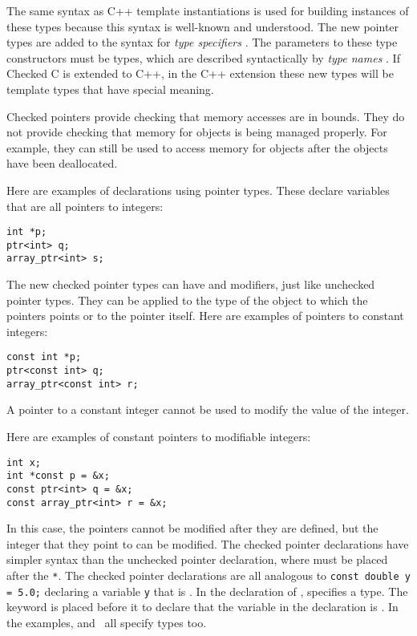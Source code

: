 The same syntax as C++ template instantiations is used for building
instances of these types because this syntax is well-known and
understood.  The new pointer types are added to the syntax for {\it type specifiers} 
\cite[Section 6.7.2]{ISO2011}. The parameters to these type constructors 
must be types, which are described syntactically by {\it type names}
\cite[Section 6.7.7]{ISO2011}.  If Checked C is extended to C++,
in the C++ extension these new types will be template types that have special meaning.

Checked pointers provide checking that memory accesses are in bounds.  They
do not provide checking that memory for objects is being managed
properly. For example, they can still be used to access memory for objects after
the objects have been deallocated.

Here are  examples of declarations using pointer types.   These declare variables that
are all pointers to integers:
\begin{verbatim}
int *p;
ptr<int> q;
array_ptr<int> s;
\end{verbatim}

The new checked pointer types can have  and 
modifiers, just like unchecked pointer types.   They can be applied to the type
of the object to which the pointers points or to the pointer itself.  Here are examples
of pointers to constant integers:
\begin{verbatim}
const int *p;
ptr<const int> q;
array_ptr<const int> r;
\end{verbatim}
A pointer to a constant integer cannot be used to modify the value of
the integer.

Here are examples of constant pointers to modifiable integers:
\begin{verbatim}
int x;
int *const p = &x;
const ptr<int> q = &x;
const array_ptr<int> r = &x;
\end{verbatim}
In this case, the pointers cannot be modified after they are defined, but 
the integer that they point to can be modified.   The checked pointer declarations 
have simpler syntax than the unchecked pointer declaration, where 
must be placed after the \verb+*+.   The checked pointer declarations are all analogous 
to \verb+const double y = 5.0;+ declaring a  variable \verb+y+ that is .
In the declaration of ,  specifies a type.
The  keyword is placed before it to declare that
the variable in the declaration is .  In the examples, \ptrint
and \arrayptrint\ all specify types too.


